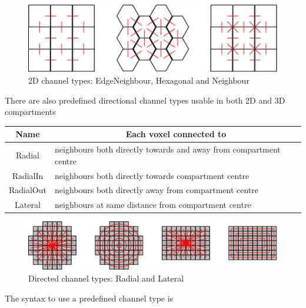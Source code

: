 \medskip 

\begin{figure}[h!]
 \centering
 \includegraphics[scale=0.2]{./images/channelTypes.png}
 \caption{2D channel types: EdgeNeighbour, Hexagonal and Neighbour}
 \label{fig:channelTypes}
\end{figure}

There are also predefined directional channel types usable in both 2D and 3D compartments

\medskip

\begin{tabular}{|c|l|}
\hline
Name & \multicolumn{1}{|c|}{Each voxel connected to}\\ 
\hline
Radial & neighbours both directly towards and away from compartment centre  \\
RadialIn & neighbours both directly towards compartment centre \\
RadialOut & neighbours both directly away from compartment centre \\
Lateral & neighbours at same distance from compartment centre \\
\hline
\end{tabular} 

\medskip 

\begin{figure}[h!]
 \centering
 \includegraphics[scale=0.2]{./images/directedChannelTypes.png}
 \caption{Directed channel types: Radial and Lateral}
 \label{fig:directedChannelTypes}
\end{figure}

The syntax to use a predefined channel type is

